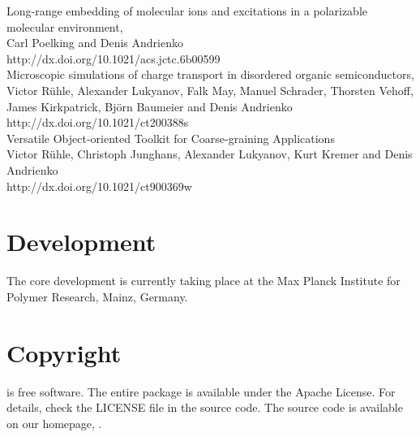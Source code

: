 \vspace{0.1cm}
\noindent
\cite{poelking_long-range_2016} Long-range embedding of molecular ions and excitations in a polarizable molecular environment, \\
Carl Poelking and Denis Andrienko \\
{http://dx.doi.org/10.1021/acs.jctc.6b00599} \\

\vspace{0.1cm}
\noindent
\cite{ruhle_microscopic_2011} Microscopic simulations of charge transport in disordered organic semiconductors, \\
Victor R\"uhle, Alexander Lukyanov, Falk May, Manuel Schrader, Thorsten Vehoff, James Kirkpatrick, Bj\"orn Baumeier and Denis Andrienko \\
{http://dx.doi.org/10.1021/ct200388s} \\

\vspace{0.1cm}
\noindent
\cite{ruhle_versatile_2009} Versatile Object-oriented Toolkit for Coarse-graining Applications \\
Victor R\"uhle, Christoph Junghans, Alexander Lukyanov, Kurt Kremer and Denis Andrienko \\
{http://dx.doi.org/10.1021/ct900369w}

\section*{Development}
The core development is currently taking place at the Max Planck Institute for Polymer Research, Mainz, Germany.

\section*{Copyright}
\votcactp is free software. The entire package is available under the Apache License. For details, check
the LICENSE file in the source code. The \votcactp source code is available on our homepage, .

\vfill
